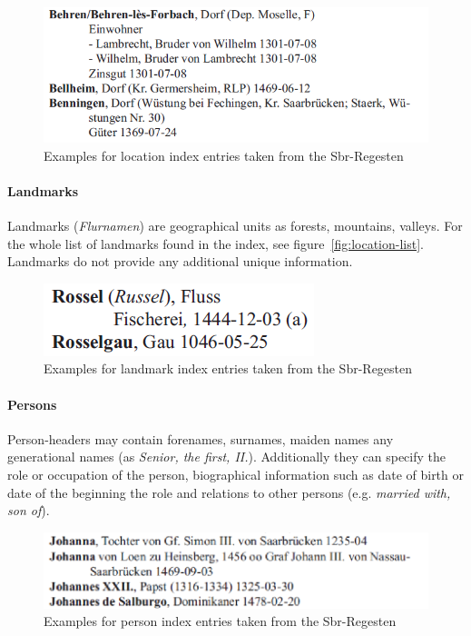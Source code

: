 \begin{figure}[h]
  \centering
  \includegraphics[scale=0.45]{img/location-example}
  \caption{Examples for location index entries taken from the Sbr-Regesten}
  \label{fig:location-example}
\end{figure}

\paragraph{Landmarks}
Landmarks (\textit{Flurnamen}) are geographical units as forests, mountains, valleys. For the whole list of landmarks found in the index, see figure~\ref{fig:location-list}. Landmarks do not provide any additional unique information.%

\begin{figure}[h]
  \centering
  \includegraphics[scale=0.45]{img/landmark-example}
  \caption{Examples for landmark index entries taken from the Sbr-Regesten}
  \label{fig:landmark-example}
\end{figure}

\paragraph{Persons}
Person-headers may contain forenames, surnames, maiden names any generational names (as \textit{Senior, the first, II.}). Additionally they can specify the role or occupation of the person, biographical information such as date of birth or date of the beginning the role and relations to other persons (e.g. \textit{married with, son of}).%
\begin{figure}[h]
  \centering
  \includegraphics[scale=0.45]{img/person-example}
  \caption{Examples for person index entries taken from the Sbr-Regesten}
  \label{fig:person-example}
\end{figure}

